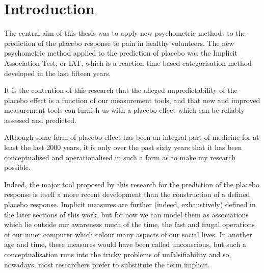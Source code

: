 \chapter{Introduction}



The central aim of this thesis was to apply new psychometric methods to the prediction of the placebo response to pain in healthy volunteers. The new psychometric method applied to the prediction of placebo was the Implicit Association Test, or IAT, which is a reaction time based categorisation method developed in the last fifteen years. 

It is the contention of this research that the alleged unpredictability of the placebo effect is a function of our measurement tools, and that new and improved measurement tools can furnish us with a placebo effect which can be reliably assessed and predicted. 

Although some form of placebo effect has been an integral part of medicine for at least the last 2000 years, it is only over the past sixty years that it has been conceptualised and operationalised in such a form as to make my research possible. 

Indeed, the major tool proposed by this research for the prediction of the placebo response is itself a more recent development than the construction of a defined placebo response. Implicit measures are further (indeed, exhaustively) defined in the later sections of this work, but for now we can model them as associations which lie outside our awareness much of the time, the fast and frugal operations of our inner computer which colour many aspects of our social lives. In another age and time, these measures would have been called unconscious, but such a conceptualisation runs into the tricky problems of unfalsifiability and so, nowadays, most researchers prefer to substitute the term implicit. 


